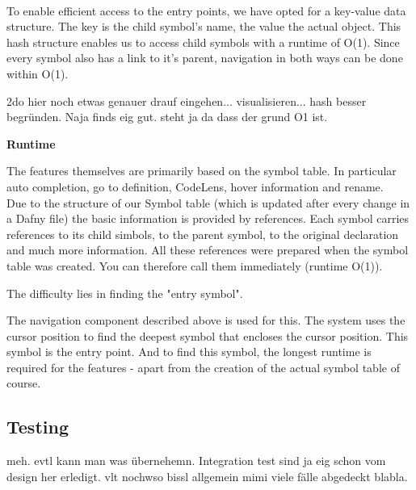  \\

To enable efficient access to the entry points, we have opted for a key-value data structure. The key is the child symbol's name, the value the actual  object.
This hash structure enables us to access child symbols with a runtime of O(1). Since every symbol also has a link to it's parent, navigation in both ways can be done within O(1).

2do hier noch etwas genauer drauf eingehen... visualisieren... hash besser begründen. Naja finds eig gut. steht ja da dass der grund O1 ist.

\textbf{Runtime}


The features themselves are primarily based on the symbol table.
In particular auto completion, go to definition, CodeLens, hover information and rename. \\

Due to the structure of our Symbol table (which is updated after every change in a Dafny file)
the basic information is provided by references.
Each symbol carries references to its child simbols, to the parent symbol, to the original declaration and much more information.
All these references were prepared when the symbol table was created. You can therefore call them immediately (runtime O(1)).  

The difficulty lies in finding the "entry symbol".

The navigation component described above is used for this. The system uses the cursor position to find the deepest symbol that encloses the cursor position. This symbol is the entry point. And to find this symbol, the longest runtime is required for the features - apart from the creation of the actual symbol table of course.




\subsection{Testing}
meh. evtl kann man was übernehemn.  Integration test sind ja eig schon vom design her erledigt. vlt nochwso bissl allgemein mimi viele fälle abgedeckt blabla.

